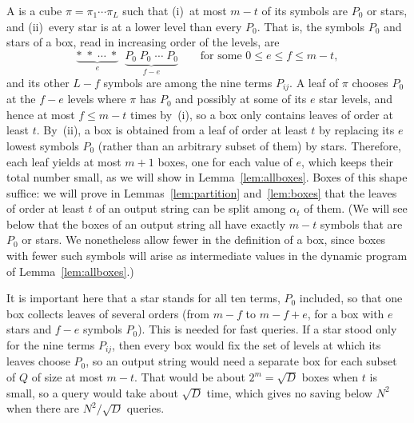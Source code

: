A  is a cube $\pi=\pi_1\cdots\pi_L$ such that (i)~at most $m-t$ of its symbols are $P_0$ or stars, and (ii)~every star is at a lower level than every $P_0$. That is, the symbols $P_0$ and stars of a box, read in increasing order of the levels, are
\[
\underbrace{\ast\;\ast\;\cdots\;\ast}_{e}\;\;\underbrace{P_0\;P_0\;\cdots\;P_0}_{f-e}\qquad\text{for some }0\le e\le f\le m-t,
\]
and its other $L-f$ symbols are among the nine terms $P_{ij}$. A leaf of $\pi$ chooses $P_0$ at the $f-e$ levels where $\pi$ has $P_0$ and possibly at some of its $e$ star levels, and hence at most $f\le m-t$ times by~(i), so a box only contains leaves of order at least $t$. By~(ii), a box is obtained from a leaf of order at least $t$ by replacing its $e$ lowest symbols $P_0$ (rather than an arbitrary subset of them) by stars. Therefore, each leaf yields at most $m+1$ boxes, one for each value of $e$, which keeps their total number small, as we will show in Lemma~\ref{lem:allboxes}. Boxes of this shape suffice: we will prove in Lemmas~\ref{lem:partition} and~\ref{lem:boxes} that the leaves of order at least $t$ of an output string can be split among $\alpha_t$ of them. (We will see below that the boxes of an output string all have exactly $m-t$ symbols that are $P_0$ or stars. We nonetheless allow fewer in the definition of a box, since boxes with fewer such symbols will arise as intermediate values in the dynamic program of Lemma~\ref{lem:allboxes}.)

It is important here that a star stands for all ten terms, $P_0$ included, so that one box collects leaves of several orders (from $m-f$ to $m-f+e$, for a box with $e$ stars and $f-e$ symbols $P_0$). This is needed for fast queries. If a star stood only for the nine terms $P_{ij}$, then every box would fix the set of levels at which its leaves choose $P_0$, so an output string would need a separate box for each subset of $Q$ of size at most $m-t$. That would be about $2^m=\sqrt D$ boxes when $t$ is small, so a query would take about $\sqrt D$ time, which gives no saving below $N^2$ when there are $N^2/\sqrt D$ queries.

